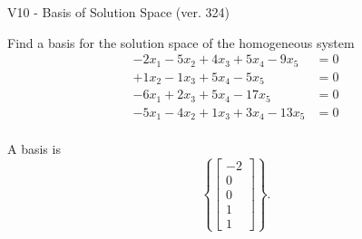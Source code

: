 \begin{exercise}
  \begin{exerciseTitle}V10 - Basis of Solution Space (ver. 324)\end{exerciseTitle}
  \begin{exerciseStatement}
    Find a basis for the solution space of the homogeneous system 
\begin{align*}
 -2 x_ 1 -5 x_ 2 + 4 x_ 3 + 5 x_ 4 -9 x_ 5 &= 0  \\ 
  + 1 x_ 2 -1 x_ 3 + 5 x_ 4 -5 x_ 5 &= 0  \\ 
  -6 x_ 1 + 2 x_ 3 + 5 x_ 4 -17 x_ 5 &= 0  \\ 
  -5 x_ 1 -4 x_ 2 + 1 x_ 3 + 3 x_ 4 -13 x_ 5 &= 0  \\ 
 \end{align*}


 
  \end{exerciseStatement}

  \begin{exerciseAnswer}
   A basis is   
\[\left\{\left[\begin{array}{c}
-2 \\
0 \\
0 \\
1 \\
1
\end{array}\right]\right\}.\]

  


  \end{exerciseAnswer}
\end{exercise}